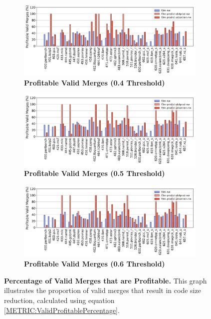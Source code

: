 \begin{figure}[tbh!]
    \centering
    \begin{subfigure}{\textwidth}
        \centering
        \includegraphics[scale=0.47]{Figures/Valid_Merging_Predictions/0.4_ValidProfitablePercentage.png}
        \caption{\textbf{Profitable Valid Merges (\textbf{0.4} Threshold)}} 
        \label{fig:0.4ValidProfitable}
    \end{subfigure}
    \begin{subfigure}{\textwidth}
        \centering
        \includegraphics[scale=0.47]{Figures/Valid_Merging_Predictions/0.5_ValidProfitablePercentage.png}
        \caption{\textbf{Profitable Valid Merges (\textbf{0.5} Threshold)}} 
        \label{fig:0.5ValidProfitable}
    \end{subfigure}
    \begin{subfigure}{\textwidth}
    \centering
        \includegraphics[scale=0.47]{Figures/Valid_Merging_Predictions/0.6_ValidProfitablePercentage.png}
        \caption{\textbf{Profitable Valid Merges (\textbf{0.6} Threshold)}} 
        \label{fig:0.6ValidProfitable}
    \end{subfigure}

    \caption{\textbf{Percentage of Valid Merges that are Profitable.} This graph illustrates the proportion of valid merges that result in code size reduction, calculated using equation \ref{METRIC:ValidProfitablePercentage}.} 
    \label{fig:ValidProfitable}
\end{figure}



